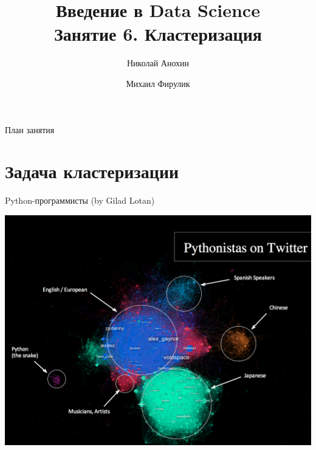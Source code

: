\documentclass[10pt,a4paper]{beamer}
\author{Николай Анохин \and Михаил Фирулик}
\title{Введение в Data Science \\ Занятие 6. Кластеризация}
\begin{document}
\maketitle



\begin{frame}{План занятия}

\tableofcontents

\end{frame}


\section{Задача кластеризации}


\begin{frame}{Python-программисты (by Gilad Lotan)}

\begin{center}
\includegraphics[scale=0.16]{images/python.png}
\end{center}

\end{frame}
\end{document}
